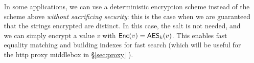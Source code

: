 In some applications, we can use a deterministic encryption scheme instead of the scheme above {\em without sacrificing security}: this is the case when we are guaranteed that the strings encrypted are distinct. In this case, the salt is not needed, and we can simply encrypt a value $v$ with $\mathsf{Enc}(v) = \mathsf{AES}_k(v)$. This enables fast equality matching and building indexes for fast search (which will be useful for the http proxy middlebox in \S\ref{sec:proxy} ).



